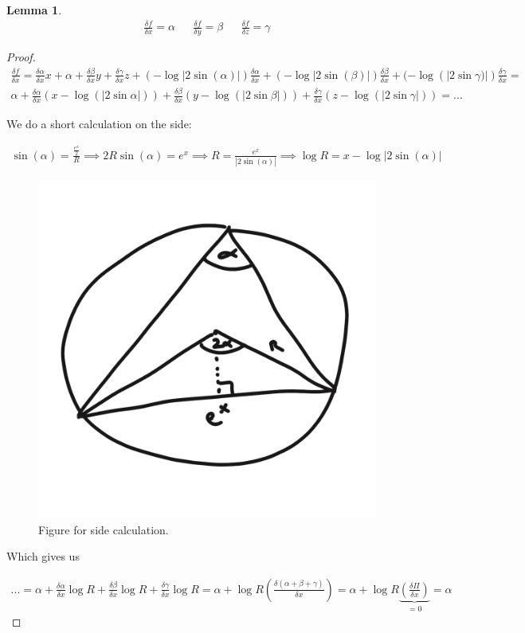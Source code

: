 \documentclass[]{article}
\newtheorem{lemma}{Lemma}
\begin{document}
\begin{lemma}
	\begin{align*}
		\frac{\delta f}{\delta x} = \alpha && \frac{\delta f}{\delta y} = \beta && \frac{\delta f}{\delta z} = \gamma
	\end{align*}
\end{lemma}

\begin{proof}
	\begin{align*}
		\frac{\delta f}{\delta x} = \frac{\delta \alpha}{\delta x} x + \alpha + \frac{\delta \beta}{\delta x} y + \frac{\delta \gamma}{\delta x}z + (- \log |2\sin(\alpha)|) \frac{\delta \alpha}{\delta x} + (-\log |2\sin(\beta)|) \frac{\delta \beta}{\delta x} + (- \log(|2\sin\gamma)|) \frac{\delta \gamma}{\delta x} =\\
		\alpha + \frac{\delta \alpha}{\delta x}(x-\log(|2\sin\alpha|)) + \frac{\delta \beta}{\delta x}(y-\log(|2\sin\beta|)) + \frac{\delta \gamma}{\delta x}(z-\log(|2\sin\gamma|)) = ...
	\end{align*}
	
	We do a short calculation on the side:
	
	\begin{align*}
		\sin(\alpha) = \frac{\frac{e^x}{2}}{R} \implies 2 R \sin(\alpha) = e^x \implies R = \frac{e^x}{|2 \sin(\alpha)|} \implies \log R = x - \log|2\sin(\alpha)|
	\end{align*}
	
	\begin{figure}[h!]
		\centering
		\includegraphics[width=0.3\linewidth]{figures/proof_deviation_f}
		\caption{Figure for side calculation.}
		\label{fig:proof_deviation_f}
	\end{figure}
	
	Which gives us
	
	\begin{align*}
		... = \alpha + \frac{\delta \alpha}{\delta x} \log R + \frac{\delta \beta}{\delta x} \log R + \frac{\delta \gamma}{\delta x} \log R = \alpha + \log R (\frac{\delta (\alpha + \beta + \gamma)}{\delta x}) = \alpha + \log R \underbrace{(\frac{\delta \Pi}{\delta x})}_{=0} = \alpha
	\end{align*}
\end{proof}
\end{document}
